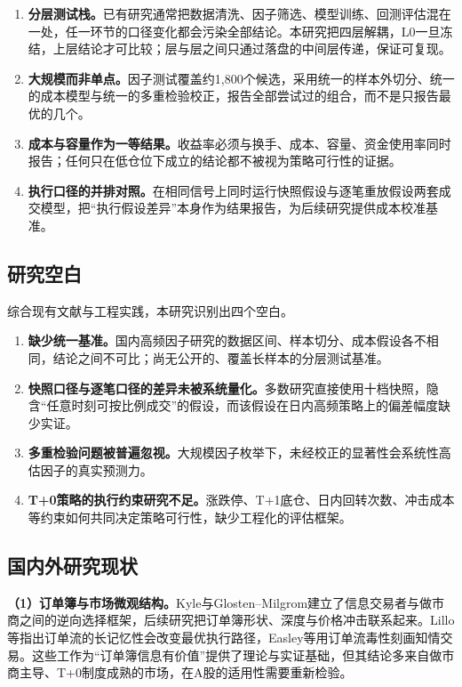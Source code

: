 \documentclass[11pt,a4paper]{article}
\begin{document}
\begin{enumerate}
  \item \textbf{分层测试栈。}已有研究通常把数据清洗、因子筛选、模型训练、回测评估混在一处，任一环节的口径变化都会污染全部结论。本研究把四层解耦，L0一旦冻结，上层结论才可比较；层与层之间只通过落盘的中间层传递，保证可复现。
  \item \textbf{大规模而非单点。}因子测试覆盖约1{,}800个候选，采用统一的样本外切分、统一的成本模型与统一的多重检验校正，报告全部尝试过的组合，而不是只报告最优的几个\citep{harvey2016,bailey2017}。
  \item \textbf{成本与容量作为一等结果。}收益率必须与换手、成本、容量、资金使用率同时报告；任何只在低仓位下成立的结论都不被视为策略可行性的证据。
  \item \textbf{执行口径的并排对照。}在相同信号上同时运行快照假设与逐笔重放假设两套成交模型，把``执行假设差异''本身作为结果报告，为后续研究提供成本校准基准。
\end{enumerate}

\subsection*{研究空白}

综合现有文献与工程实践，本研究识别出四个空白。

\begin{enumerate}
  \item \textbf{缺少统一基准。}国内高频因子研究的数据区间、样本切分、成本假设各不相同，结论之间不可比；尚无公开的、覆盖长样本的分层测试基准。
  \item \textbf{快照口径与逐笔口径的差异未被系统量化。}多数研究直接使用十档快照，隐含``任意时刻可按比例成交''的假设，而该假设在日内高频策略上的偏差幅度缺少实证。
  \item \textbf{多重检验问题被普遍忽视。}大规模因子枚举下，未经校正的显著性会系统性高估因子的真实预测力\citep{mclean2016}。
  \item \textbf{T+0策略的执行约束研究不足。}涨跌停、T+1底仓、日内回转次数、冲击成本等约束如何共同决定策略可行性，缺少工程化的评估框架。
\end{enumerate}

\subsection*{国内外研究现状}

\textbf{（1）订单簿与市场微观结构。}Kyle与Glosten--Milgrom建立了信息交易者与做市商之间的逆向选择框架\citep{kyle1985,glosten1985}，后续研究把订单簿形状、深度与价格冲击联系起来\citep{parlour1998, bouchaud2009}。Lillo等指出订单流的长记忆性会改变最优执行路径\citep{lillo2003}，Easley等用订单流毒性刻画知情交易\citep{easley1992,easley1996}。这些工作为``订单簿信息有价值''提供了理论与实证基础，但其结论多来自做市商主导、T+0制度成熟的市场，在A股的适用性需要重新检验。
\end{document}
